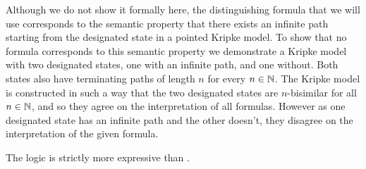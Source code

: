 Although we do not show it formally here, the distinguishing \langRml{} formula that we will use corresponds to the semantic property that there exists an infinite path starting from the designated state in a pointed Kripke model.
To show that no \langMl{} formula corresponds to this semantic property we demonstrate a \classKF{} Kripke model with two designated states, one with an infinite path, and one without.
Both states also have terminating paths of length $n$ for every $n \in \mathbb{N}$.
The Kripke model is constructed in such a way that the two designated states are $n$-bisimilar for all $n \in \mathbb{N}$, and so they agree on the interpretation of all \langMl{} formulas.
However as one designated state has an infinite path and the other doesn't, they disagree on the interpretation of the given \langRml{} formula.

\begin{theorem}
The logic \logicRmlKF{} is strictly more expressive than \logicKF{}.
\end{theorem}

